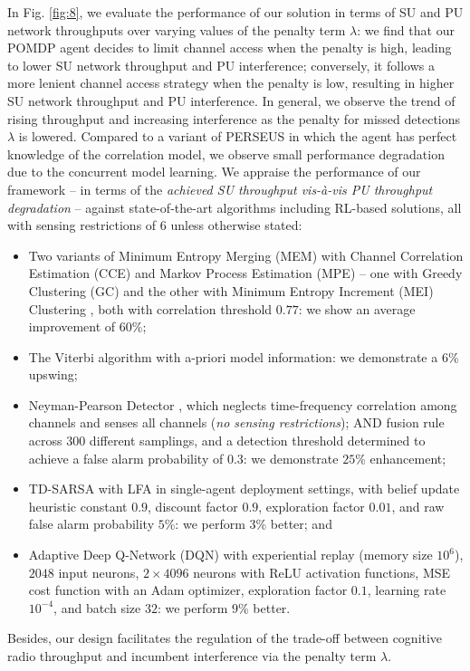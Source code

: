 \documentclass[10pt,twocolumn]{IEEEtran}
\begin{document}
In Fig. \ref{fig:8}, we evaluate the performance of our solution in terms of SU and PU network throughputs over varying values of the penalty term $\lambda$: we find that our POMDP agent decides to limit channel access when the penalty is high, leading to lower SU network throughput and PU interference; conversely, it follows a more lenient channel access strategy when the penalty is low, resulting in higher SU network throughput and PU interference. In general, we observe the trend of rising throughput and increasing interference as the penalty for missed detections $\lambda$ is lowered.
Compared to a variant of PERSEUS in which the agent has perfect knowledge of the correlation model, we observe small performance degradation due to the concurrent model learning. We appraise the performance of our framework -- in terms of the \emph{achieved SU throughput vis-à-vis PU throughput degradation} -- against state-of-the-art algorithms including RL-based solutions, all with sensing restrictions of 6 unless otherwise stated:
\begin{itemize}[leftmargin=*]
\item Two variants of Minimum Entropy Merging (MEM) with Channel Correlation Estimation (CCE) and Markov Process Estimation (MPE) -- one with Greedy Clustering (GC) and the other with Minimum Entropy Increment (MEI) Clustering \cite{6956794}, both with correlation threshold $0.77$: we show an average improvement of $60$\%;
\item  The Viterbi algorithm \cite{4554696} with a-priori model information: we demonstrate a $6$\% upswing;
\item Neyman-Pearson Detector \cite{5167826}, which neglects time-frequency correlation among channels and senses all channels (\emph{no sensing restrictions}); AND fusion rule across 300 different samplings, and a detection threshold determined to achieve a false alarm probability of $0.3$: we demonstrate $25$\% enhancement;
\item TD-SARSA with LFA \cite{6507570} in single-agent deployment settings, with belief update heuristic constant $0.9$, discount factor $0.9$, exploration factor $0.01$, and raw false alarm probability $5$\%: we perform $3$\% better; and
\item Adaptive Deep Q-Network (DQN) \cite{DQN} with experiential replay (memory size $10^{6}$), $2048$ input neurons, $2{\times}4096$ neurons with ReLU activation functions, MSE cost function with an Adam optimizer, exploration factor $0.1$, learning rate $10^{-4}$, and batch size $32$: we perform $9$\% better.
\end{itemize}
Besides, our design facilitates the regulation of the trade-off between cognitive radio throughput and incumbent interference via the penalty term $\lambda$.
\vspace{-7mm}
\end{document}
